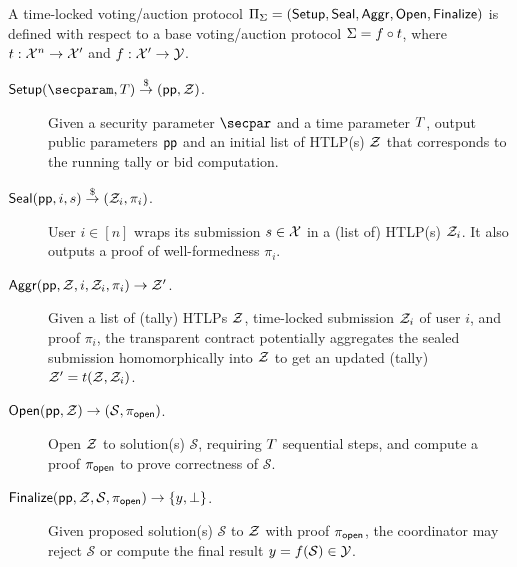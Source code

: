 
\begin{definition}\label{def:syntax}
A time-locked voting/auction protocol $\Pi_\Sigma = (\mathsf{Setup}, \mathsf{Seal},\allowbreak \mathsf{Aggr}, \mathsf{Open}, \mathsf{Finalize})$ is defined with respect to a base voting/auction protocol $\Sigma = f \circ t$, where $t : \mathcal{X}^n \to \mathcal{X}'$ and $f : \mathcal{X}' \to \mathcal{Y}$. %

    \begin{description}
        \item[$\Setup(\secparam, \Ttime) \randout (\pp, \Z)$.] Given a security parameter $\secpar$ and a time parameter $T$, output public parameters $\mathsf{pp}$ and an initial list of HTLP(s) $\mathcal{Z}$ that corresponds to the running tally or bid computation.
        \item[$\mathsf{Seal}(\mathsf{pp}, i, s) \stackrel{\$}{\to} (\mathcal{Z}_i, \pi_i)$.] User $i\in[n]$ wraps its submission $s \in \mathcal{X}$ in a (list of) HTLP(s) $\mathcal{Z}_i$. It also outputs a proof of well-formedness $\pi_i$.
        \item[$\mathsf{Aggr}(\mathsf{pp}, \mathcal{Z}, i, \mathcal{Z}_i, \pi_i) \to \mathcal{Z}'$.] Given a list of (tally) HTLPs $\mathcal{Z}$, time-locked submission $\mathcal{Z}_i$ of user $i$, and proof $\pi_i$, the transparent contract potentially aggregates the sealed submission homomorphically into $\mathcal{Z}$ to get an updated (tally) $\mathcal{Z}' = t(\mathcal{Z}, \mathcal{Z}_i)$.
        \item[$\mathsf{Open}(\mathsf{pp}, \mathcal{Z}) \to (\mathcal{S}, \pi_{\mathsf{open}})$.] Open $\mathcal{Z}$ to solution(s) $\mathcal{S}$, requiring $T$ sequential steps, and compute a proof $\pi_{\mathsf{open}}$ to prove correctness of $\mathcal{S}$.
        \item[$\mathsf{Finalize}(\mathsf{pp}, \mathcal{Z}, \mathcal{S}, \pi_{\mathsf{open}}) \to \{y, \perp\}$.] Given proposed solution(s) $\mathcal{S}$ to $\mathcal{Z}$ with proof $\pi_{\sf open}$, the coordinator may reject $\mathcal{S}$ or compute the final result $y = f(\mathcal{S}) \in \mathcal{Y}$. %
    \end{description}
\end{definition}


